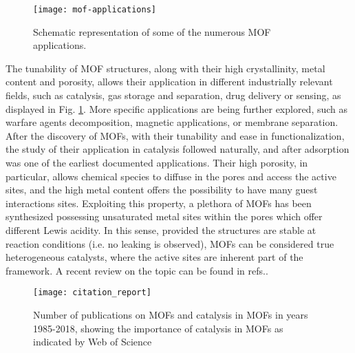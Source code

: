 %
%
\begin{figure}[htbp]
	\centering
 	\texttt{[image: mof-applications]}
	\caption{Schematic representation of some of the numerous MOF applications.}
	\label{fig:mof-applications}
\end{figure}
%
%
\npar
The tunability of MOF structures, along with their high crystallinity, metal content and porosity, allows their application in different industrially relevant fields, such as catalysis, gas storage and separation, drug delivery or sensing, as displayed in Fig. \ref{fig:mof-applications}. More specific applications are being further explored, such as warfare agents decomposition, magnetic applications, or membrane separation. 
After the discovery of MOFs, with their tunability and ease in functionalization, the study of their application in catalysis followed naturally, and after adsorption was one of the earliest documented applications\cite{Fujita1994}. 
Their high porosity, in particular, allows chemical species to diffuse in the pores and access the active sites, and the high metal content offers the possibility to have many guest interactions sites. Exploiting this property, a plethora of MOFs has been synthesized possessing unsaturated metal sites within the pores which offer different Lewis acidity. In this sense, provided the structures are stable at reaction conditions (i.e. no leaking is observed), MOFs can be considered true heterogeneous catalysts, where the active sites are inherent part of the framework. A recent review on the topic can be found in refs.\cite{rogge2017metal, yang2019catalysis}.
%
\begin{figure}[!htbp]
	\centering
 	\texttt{[image: citation\_report]}
	\caption{Number of publications on MOFs and catalysis in MOFs in years 1985-2018, showing the importance of catalysis in MOFs as indicated by Web of Science}
	\label{fig:citation_report}
\end{figure}
%
